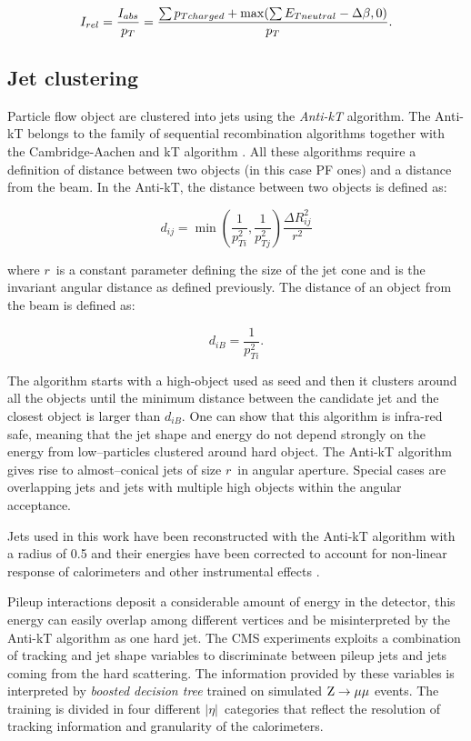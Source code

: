 \begin{equation}
I_{rel} = \dfrac{I_{abs}}{p_{T}} =  \dfrac{\sum{p_{T charged}} + \operatorname{max}(\sum{E_{T neutral}} - \Delta \beta, 0)}{p_T}.
\label{eq:db_rel_iso}
\end{equation}

\subsection{Jet clustering}

Particle flow object are clustered into jets using the \emph{Anti-kT} \cite{Cacciari:2008gp} algorithm. The Anti-kT belongs to the family of sequential recombination algorithms together with the Cambridge-Aachen and kT algorithm \cite{Ellis:1993tq,Dokshitzer:1997in}. All these algorithms require a definition of distance between two objects (in this case PF ones) and a distance from the beam. In the Anti-kT, the distance between two objects is defined as:

\begin{equation}
d_{ij} = \operatorname{min}(\dfrac{1}{p_{Ti}^2},\dfrac{1}{p_{Tj}^2})\dfrac{\Delta R_{ij}^2}{r^2}
\end{equation}

where $r$\ is a constant parameter defining the size of the jet cone and \DR is the invariant angular distance as defined previously.
The distance of an object from  the beam is defined as:

\begin{equation}
d_{iB} = \dfrac{1}{p_{Ti}^2}.
\end{equation}

The algorithm starts with a high-\pT object used as seed and then it clusters around all the objects until the minimum distance between the candidate jet and the closest object is larger than $d_{iB}$. One can show that this algorithm is infra-red safe, meaning that the jet shape and energy do not depend strongly on the energy from low--\pT particles clustered around hard object. The Anti-kT algorithm gives rise to almost--conical jets of size $r$\ in angular aperture. Special cases are overlapping jets and jets with multiple high \pT objects within the angular acceptance.

Jets used in this work have been reconstructed with the Anti-kT algorithm with a radius of 0.5 and their energies have been corrected to account for non-linear response of calorimeters and other instrumental effects \cite{Chatrchyan:2011ds}.

Pileup interactions deposit a considerable amount of energy in the detector, this energy can easily overlap among different vertices and be misinterpreted by the Anti-kT algorithm as one hard jet. The CMS experiments exploits a combination of tracking and jet shape variables to discriminate between pileup jets and jets coming from the hard scattering. The information provided by these variables is interpreted by \emph{boosted decision tree} \cite{CMS-PAS-JME-13-005} trained on simulated $\mathrm{Z}\rightarrow\mu\mu$ events. The training is divided in four different $|\eta|$\ categories that reflect the resolution of tracking information and granularity of the calorimeters.

